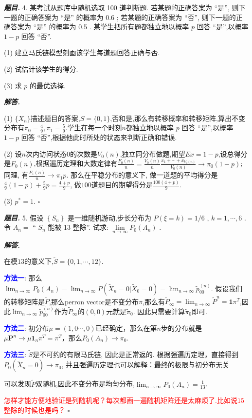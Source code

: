 \documentclass[10pt, a4paper, oneside]{ctexart}
\newenvironment{problem}{\begin{framed}\par\noindent\textbf{\textit{题目. }}}{\end{framed}\par}
\newenvironment{solution}{%
  \par\noindent\textbf{\textit{解答. }}\ignorespaces
}{%
  \hfill\ensuremath{\square}\par %
}
\begin{document}
\begin{problem}
    4. 某考试从题库中随机选取 100 道判断题. 若某题的正确答案为 “是”, 则下一题的正确答案为 “是” 的概率为 0.6 ; 若某题的正确答案为 “否”, 则下一题的正确答案为 “是” 的概率为 0.5 . 某学生把所有题都独立地以概率 \( p \) 回答 “是”,以概率 \( 1 - p \) 回答 “否”.

(1) 建立马氏链模型刻画该学生每道题回答正确与否.

(2) 试估计该学生的得分.

(3) 求 \( p \) 的最优选择.
\end{problem}

\begin{solution}
    (1) $\{X_n\}$描述题目的答案,$S=\{0,1\}$,否和是,那么有转移概率和转移矩阵,算出不变分布有$\pi_0=\frac{4}{9},\pi_1=\frac{5}{9}$.学生在每一个时刻$n$都独立地以概率 \( p \) 回答 “是”,以概率 \( 1 - p \) 回答 “否”,根据他此时所处的状态来判断正确和错误.

    (2) 设$n$次内访问状态$0$的次数是$V_0(n)$,独立同分布做题,期望$Ex=1-p$,设总得分是$F_0(n)$,根据遍历定理和大数定律有$\frac{F_0(n)}{n}=\frac{V_0(n)}{n}\frac{x_1+\cdots+x_{V_0(n)}}{V_0(n)}\to \pi_0(1-p)$; 同理, 有$\frac{F_1(n)}{n}\to \pi_1p$. 那么在平稳分布的意义下, 做一道题的平均得分是$\frac{4}{9}(1-p)+\frac{5}{9}p=\frac{4+p}{9}$, 做$100$道题目的期望得分是$\frac{100(4+p)}{9}$.

    (3) $p^*=1$.
\end{solution}

\begin{problem}
    5. 假设 \( \left\{  {S}_{n}\right\}   \) 是一维随机游动,步长分布为 \( P\left( {\xi  = k}\right)  = 1/6 \) , \( k = 1,\cdots ,6 \) . 令 \( {A}_{n} =  \) “ \( {S}_{n} \) 能被 13 整除”. 试求: \( \mathop{\lim }\limits_{{n \rightarrow  \infty }}{P}_{0}\left( {A}_{n}\right)  \) .
\end{problem}
\begin{solution}
    在模$13$的意义下,$\tilde{S}=\{0,1,\cdots,12\}$. 
    
    \textcolor{blue}{\textbf{方法一}}: 那么$\lim_{n\to\infty}P_0(A_n)=\lim_{n\to\infty}P(\tilde{X}_n=0|\tilde{X}_0=0)=\lim_{n\to\infty}\tilde{p}_{00}^{(n)}$. 假设我们的转移矩阵是$\tilde{P}$,那么perron vector是不变分布$\pi$,那么有$\tilde{P}_{\infty}=\lim_{n\to \infty}\tilde{P}^n=\mathbf{1}\pi^T$,因此$\lim_{n\to\infty}\tilde{p}_{00}^{(n)}$作为$\tilde{P}_{\infty}$的$(0,0)$元就是$\tilde{\pi}_0$. 因此只需要计算$\tilde{\pi}_0$即可. 

    \textcolor{blue}{\textbf{方法二}}: 初分布$\mu=(1,0\cdots,0)$已经确定，那么在第$n$步的分布就是$\mu \mathbf{P}^n\to \mu \mathbf{1}_n \pi^T =\pi^T$，那么$P_0(A_n)\to \pi_0$.

    \textcolor{blue}{\textbf{方法三}}: $\tilde{S}$是不可约的有限马氏链, 因此是正常返的. 根据强遍历定理，直接得到$P_0(\tilde{X}_n=0)\to \pi_0$, 并且强遍历定理也可以解释：最终的极限与初分布无关

    可以发现$\tilde{P}$双随机,因此不变分布是均匀分布,$\lim_{n\to\infty}P_0(A_n)=\frac{1}{13}$.
    
    \textcolor{red}{怎样才能方便地验证是列随机呢？每次都画一遍随机矩阵还是太麻烦了.比如说$15$整除的时候也是吗？}
\end{solution}
\end{document}

